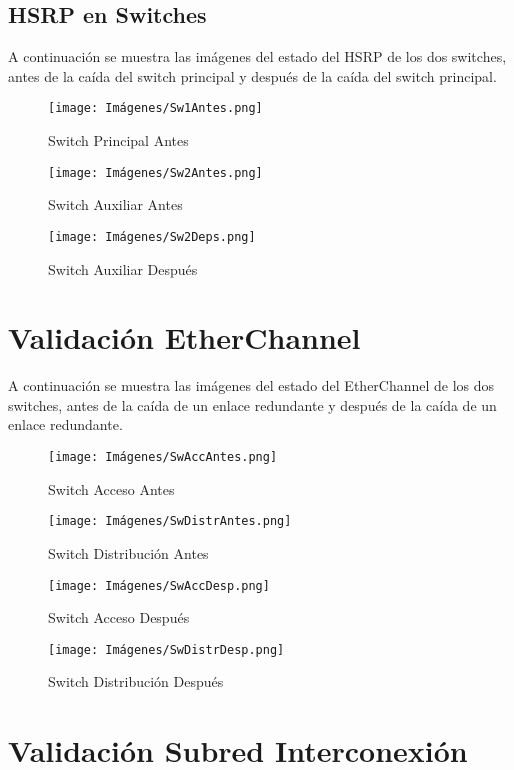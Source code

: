 \subsection{HSRP en Switches}\label{anexo:pruebahsrpsw}
A continuación se muestra las imágenes del estado del HSRP de los dos switches, antes de la caída del switch principal y después de la caída del switch principal.
\begin{figure}[H]
    \centering
    \texttt{[image: Imágenes/Sw1Antes.png]}
    \caption{Switch Principal Antes}
\end{figure}
\begin{figure}[H]
    \centering
    \texttt{[image: Imágenes/Sw2Antes.png]}
    \caption{Switch Auxiliar Antes}
\end{figure}
\begin{figure}[H]
    \centering
    \texttt{[image: Imágenes/Sw2Deps.png]}
    \caption{Switch Auxiliar Después}
\end{figure}
\section{Validación EtherChannel}\label{anexo:pruebaether}
A continuación se muestra las imágenes del estado del EtherChannel de los dos switches, antes de la caída de un enlace redundante y después de la caída de un enlace redundante.
\begin{figure}[H]
    \centering
    \texttt{[image: Imágenes/SwAccAntes.png]}
    \caption{Switch Acceso Antes}
\end{figure}
\begin{figure}[H]
    \centering
    \texttt{[image: Imágenes/SwDistrAntes.png]}
    \caption{Switch Distribución Antes}
\end{figure}
\begin{figure}[H]
    \centering
    \texttt{[image: Imágenes/SwAccDesp.png]}
    \caption{Switch Acceso Después}
\end{figure}
\begin{figure}[H]
    \centering
    \texttt{[image: Imágenes/SwDistrDesp.png]}
    \caption{Switch Distribución Después}
\end{figure}
\section{Validación Subred Interconexión}\label{anexo:pruebasubrinter}

